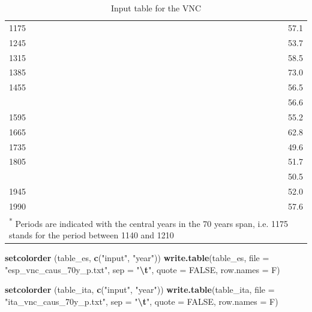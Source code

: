 \documentclass[
]{article}
\newenvironment{Shaded}{\begin{snugshade}}{\end{snugshade}}
\newcommand{\AttributeTok}[1]{\textcolor[rgb]{0.13,0.29,0.53}{#1}}
\newcommand{\ConstantTok}[1]{\textcolor[rgb]{0.56,0.35,0.01}{#1}}
\newcommand{\FunctionTok}[1]{\textcolor[rgb]{0.13,0.29,0.53}{\textbf{#1}}}
\newcommand{\NormalTok}[1]{#1}
\newcommand{\SpecialCharTok}[1]{\textcolor[rgb]{0.81,0.36,0.00}{\textbf{#1}}}
\newcommand{\StringTok}[1]{\textcolor[rgb]{0.31,0.60,0.02}{#1}}
\begin{document}
\begin{table}
\centering
\caption{\label{tab:unnamed-chunk-5}Input table for the VNC}
\centering
\begin{tabular}[t]{lr}
\toprule
\midrule
1175 & 57.1\\
1245 & 53.7\\
1315 & 58.5\\
1385 & 73.0\\
1455 & 56.5\\
\addlinespace
1525 & 56.6\\
1595 & 55.2\\
1665 & 62.8\\
1735 & 49.6\\
1805 & 51.7\\
\addlinespace
1875 & 50.5\\
1945 & 52.0\\
1990 & 57.6\\
\bottomrule
\multicolumn{2}{l}{\rule{0pt}{1em}\textsuperscript{*} Periods are indicated with the central years in the 70 years span, i.e. 1175 stands for the period between 1140 and 1210}\\
\end{tabular}
\end{table}

\begin{Shaded}
\begin{Highlighting}[]
\FunctionTok{setcolorder}\NormalTok{ (table\_es, }\FunctionTok{c}\NormalTok{(}\StringTok{"input"}\NormalTok{, }\StringTok{"year"}\NormalTok{))}
\FunctionTok{write.table}\NormalTok{(table\_es, }\AttributeTok{file =} \StringTok{"esp\_vnc\_caus\_70y\_p.txt"}\NormalTok{, }\AttributeTok{sep =} \StringTok{"}\SpecialCharTok{\textbackslash{}t}\StringTok{"}\NormalTok{, }\AttributeTok{quote =} \ConstantTok{FALSE}\NormalTok{, }\AttributeTok{row.names =}\NormalTok{ F)}

\FunctionTok{setcolorder}\NormalTok{ (table\_ita, }\FunctionTok{c}\NormalTok{(}\StringTok{"input"}\NormalTok{, }\StringTok{"year"}\NormalTok{))}
\FunctionTok{write.table}\NormalTok{(table\_ita, }\AttributeTok{file =} \StringTok{"ita\_vnc\_caus\_70y\_p.txt"}\NormalTok{, }\AttributeTok{sep =} \StringTok{"}\SpecialCharTok{\textbackslash{}t}\StringTok{"}\NormalTok{, }\AttributeTok{quote =} \ConstantTok{FALSE}\NormalTok{, }\AttributeTok{row.names =}\NormalTok{ F)}
\end{Highlighting}
\end{Shaded}
\end{document}

